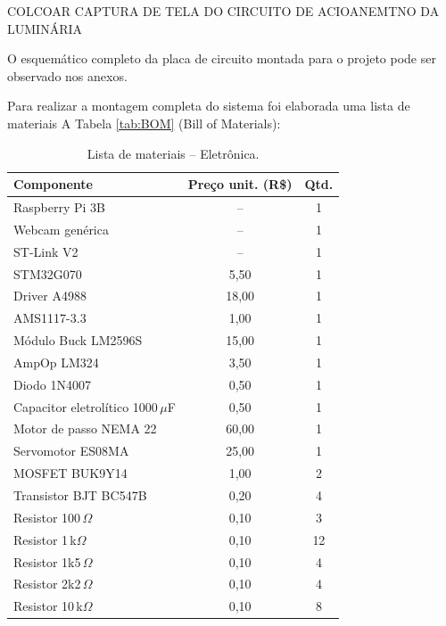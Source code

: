  COLCOAR CAPTURA DE TELA DO CIRCUITO DE ACIOANEMTNO DA LUMINÁRIA
    
O esquemático completo da placa de circuito montada para o projeto pode ser observado nos anexos.

Para realizar a montagem completa do sistema foi elaborada uma lista de materiais A Tabela \ref{tab:BOM} (Bill of Materials):


\begin{table}[!htpb]
\caption{Lista de materiais -- Eletrônica.}
\label{tab:BOM_eletro}
\centering
\renewcommand{\arraystretch}{0.85}
\small
\begin{tabular}{lcc}
\hline
\textbf{Componente} & \textbf{Preço unit. (R\$)} & \textbf{Qtd.} \\
\hline
Raspberry Pi 3B                        & --   & 1  \\
Webcam genérica                        & --   & 1  \\
ST-Link V2                             & --   & 1  \\
STM32G070                              & 5,50 & 1  \\
Driver A4988                           & 18,00 & 1  \\
AMS1117-3.3                            & 1,00 & 1  \\
Módulo Buck LM2596S                    & 15,00 & 1  \\
AmpOp LM324                            & 3,50 & 1  \\
Diodo 1N4007                           & 0,50 & 1  \\
Capacitor eletrolítico 1000\,$\mu$F    & 0,50 & 1  \\
Motor de passo NEMA 22                 & 60,00 & 1  \\
Servomotor ES08MA                      & 25,00 & 1  \\
MOSFET BUK9Y14                         & 1,00 & 2  \\
Transistor BJT BC547B                  & 0,20 & 4  \\
Resistor 100\,$\Omega$                 & 0,10 & 3  \\
Resistor 1\,k$\Omega$                  & 0,10 & 12 \\
Resistor 1k5\,$\Omega$                 & 0,10 & 4  \\
Resistor 2k2\,$\Omega$                 & 0,10 & 4  \\
Resistor 10\,k$\Omega$                 & 0,10 & 8  \\

\end{tabular}
\end{table}
